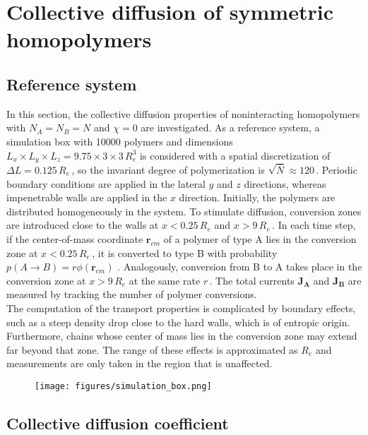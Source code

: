 \documentclass[bachelor,       %
               twoside,        %
               BCOR10mm,       %
                ngerman,english  %
               ]{GAUBM}
\begin{document}
\chapter{Collective diffusion of symmetric homopolymers}

\section{Reference system}

In this section, the collective diffusion properties of noninteracting homopolymers with $N_A=N_B=N$ and $\chi=0$ are investigated. As a reference system, a simulation box with 10000 polymers and dimensions $L_x\times L_y\times L_z=9.75\times3\times3\,R_e^3$ is considered with a spatial discretization of $\Delta L=0.125\,R_e\,$, so the invariant degree of polymerization is $\sqrt{\bar{N}}\approx 120\,$. Periodic boundary conditions are applied in the lateral $y$ and $z$ directions, whereas impenetrable walls are applied in the $x$ direction. Initially, the polymers are distributed homogeneously in the system. To stimulate diffusion, conversion zones are introduced close to the walls at $x<0.25\,R_e$ and $x>9\,R_e\,$. In each time step, if the center-of-mass coordinate $\mathbf r_{cm}$ of a polymer of type A lies in the conversion zone at $x<0.25\,R_e\,$, it is converted to type B with probability $p(A\rightarrow B)=r\phi(\mathbf r_{cm})$ \cite{Dreyer22}. Analogously, conversion from B to A takes place in the conversion zone at $x>9\,R_e$ at the same rate $r\,$. The total currents $\mathbf{J_A}$ and $\mathbf{J_B}$ are measured by tracking the number of polymer conversions. \\
The computation of the transport properties is complicated by boundary effects, such as a steep density drop close to the hard walls, which is of entropic origin. Furthermore, chains whose center of mass lies in the conversion zone may extend far beyond that zone. The range of these effects is approximated as $R_e$ and measurements are only taken in the region that is unaffected. 


\begin{figure}[h]
  \centering
  \texttt{[image: figures/simulation\_box.png]}
  \caption{}
  \label{fig:simulation_box}
\end{figure}


\section{Collective diffusion coefficient}
\end{document}
